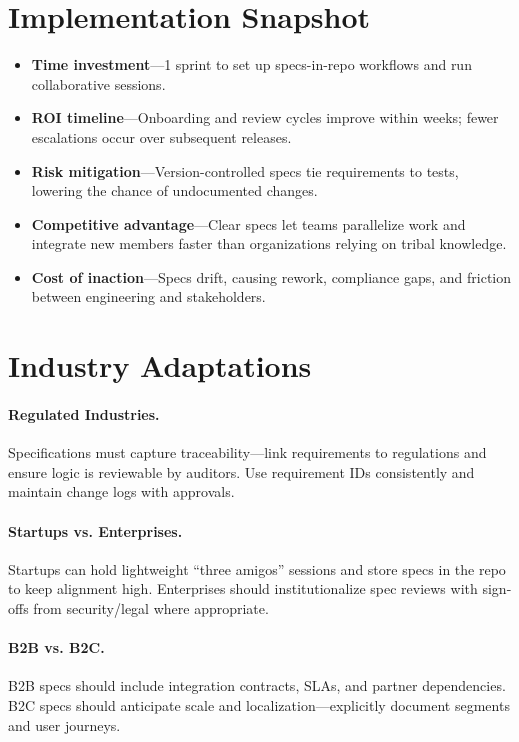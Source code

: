 \section{Implementation Snapshot}
\label{sec:reqspec-snapshot}
\begin{itemize}
    \item \textbf{Time investment}—1 sprint to set up specs-in-repo workflows and run collaborative sessions.
    \item \textbf{ROI timeline}—Onboarding and review cycles improve within weeks; fewer escalations occur over subsequent releases.
    \item \textbf{Risk mitigation}—Version-controlled specs tie requirements to tests, lowering the chance of undocumented changes.
    \item \textbf{Competitive advantage}—Clear specs let teams parallelize work and integrate new members faster than organizations relying on tribal knowledge.
    \item \textbf{Cost of inaction}—Specs drift, causing rework, compliance gaps, and friction between engineering and stakeholders.
\end{itemize}
\section{Industry Adaptations}
\label{sec:reqspec-industry}
\paragraph{Regulated Industries.} Specifications must capture traceability—link requirements to regulations and ensure logic is reviewable by auditors. Use requirement IDs consistently and maintain change logs with approvals.

\paragraph{Startups vs. Enterprises.} Startups can hold lightweight ``three amigos'' sessions and store specs in the repo to keep alignment high. Enterprises should institutionalize spec reviews with sign-offs from security/legal where appropriate.

\paragraph{B2B vs. B2C.} B2B specs should include integration contracts, SLAs, and partner dependencies. B2C specs should anticipate scale and localization—explicitly document segments and user journeys.

